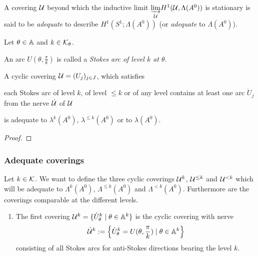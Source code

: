 \begin{defn}
  A covering $\mathcal{U}$ beyond which the inductive limit
  $\underset{\mathcal{U}}{\underrightarrow{\lim}}H^1(\mathcal{U},\Lambda(A^0))$ is stationary
  is said to be \emph{adequate} to describe $H^1(S^1;\Lambda(A^0))$ (or
  \emph{adequate} to $\Lambda(A^0)$).
\end{defn}

\begin{prop}
  Let $\theta\in\mathbb{A}$ and $k\in\mathcal{K}_\theta$.
  \begin{s-defn}
    An arc $U(\theta,\frac{\pi}{k})$ is called a \emph{Stokes arc of level $k$
    at $\theta$}.
  \end{s-defn}
  A cyclic covering $\mathcal{U}=(U_j)_{j\in J}$, which satisfies
  \begin{einr}
    each Stokes arc of level $k$, of level $\leq k$ or of any level
    contains at least one arc $\dot U_j$ from the nerve $\dot{\mathcal{U}}$ of $\mathcal{U}$
  \end{einr}
  is adequate to $\lambda^k(A^0)$, $\lambda^{\leq k}(A^0)$ or to $\lambda(A^0)$.
\end{prop}
\begin{proof}
  \TODO{}
\end{proof}

\subsubsection{Adequate coverings}
Let $k\in\mathcal{K}$.
We want to define the three cyclic coverings $\mathcal{U}^{k}$, $\mathcal{U}^{\leq k}$ and
$\mathcal{U}^{<k}$ which will be adequate to $\Lambda^k(A^0)$, $\Lambda^{\leq k}(A^0)$
and $\Lambda^{<k}(A^0)$. Furthermore are the coverings comparable at the
different levels.

\begin{enumerate}
  \item The first covering $\mathcal{U}^{k}=\{\dot U_\theta^k\mid\theta\in\mathbb{A}^k\}$
    is the cyclic covering with nerve
    \[
      \dot{\mathcal{U}}^k:=
      \left\{\dot U_\theta^k=U(\theta,\frac{\pi}{k})\mid\theta\in\mathbb{A}^k\right\}
    \]
    consisting of all Stokes arcs for anti-Stokes directions bearing the level
    $k$.
\end{enumerate}

